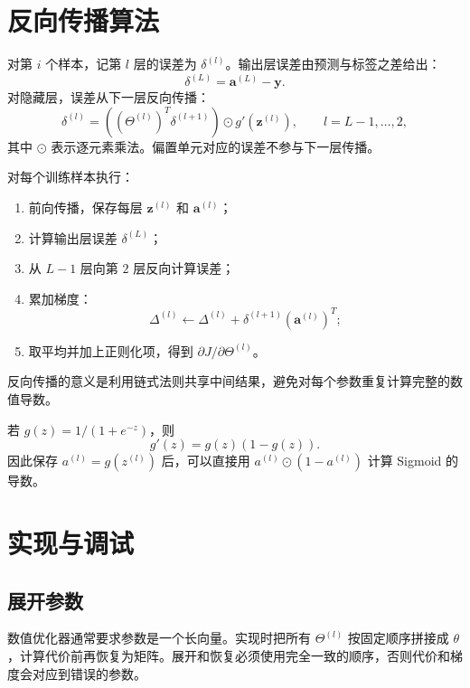 \section{反向传播算法}
\begin{definitionbox}[误差项]
对第 $i$ 个样本，记第 $l$ 层的误差为 $\delta^{(l)}$。输出层误差由预测与标签之差给出：
\[
\delta^{(L)}=\mathbf a^{(L)}-\mathbf y.
\]
对隐藏层，误差从下一层反向传播：
\[
\delta^{(l)}=\left((\Theta^{(l)})^T\delta^{(l+1)}\right)\odot
g'\!\left(\mathbf z^{(l)}\right),
\qquad l=L-1,\ldots,2,
\]
其中 $\odot$ 表示逐元素乘法。偏置单元对应的误差不参与下一层传播。
\end{definitionbox}
\begin{keybox}[反向传播流程]
对每个训练样本执行：
\begin{enumerate}
  \item 前向传播，保存每层 $\mathbf z^{(l)}$ 和 $\mathbf a^{(l)}$；
  \item 计算输出层误差 $\delta^{(L)}$；
  \item 从 $L-1$ 层向第 $2$ 层反向计算误差；
  \item 累加梯度：
  \[
  \Delta^{(l)}\leftarrow\Delta^{(l)}+\delta^{(l+1)}(\mathbf a^{(l)})^T;
  \]
  \item 取平均并加上正则化项，得到 $\partial J/\partial\Theta^{(l)}$。
\end{enumerate}
反向传播的意义是利用链式法则共享中间结果，避免对每个参数重复计算完整的数值导数。
\end{keybox}
\begin{examplebox}[Sigmoid 导数]
若 $g(z)=1/(1+e^{-z})$，则
\[
g'(z)=g(z)(1-g(z)).
\]
因此保存 $a^{(l)}=g(z^{(l)})$ 后，可以直接用 $a^{(l)}\odot(1-a^{(l)})$ 计算 Sigmoid 的导数。
\end{examplebox}

\section{实现与调试}
\subsection{展开参数}
\begin{definitionbox}[把矩阵参数变成向量]
数值优化器通常要求参数是一个长向量。实现时把所有 $\Theta^{(l)}$ 按固定顺序拼接成 $\theta$，计算代价前再恢复为矩阵。展开和恢复必须使用完全一致的顺序，否则代价和梯度会对应到错误的参数。
\end{definitionbox}
